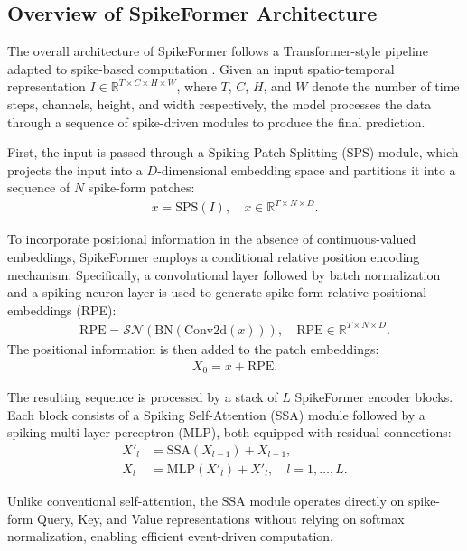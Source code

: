 \documentclass[../main.tex]{subfiles}
\begin{document}
\subsection{Overview of SpikeFormer Architecture}

The overall architecture of SpikeFormer follows a Transformer-style pipeline adapted to spike-based computation \cite{zhou2023spikeformer}. Given an input spatio-temporal representation $I \in \mathbb{R}^{T \times C \times H \times W}$, where $T$, $C$, $H$, and $W$ denote the number of time steps, channels, height, and width respectively, the model processes the data through a sequence of spike-driven modules to produce the final prediction.

First, the input is passed through a Spiking Patch Splitting (SPS) module, which projects the input into a $D$-dimensional embedding space and partitions it into a sequence of $N$ spike-form patches:
\begin{align}
x = \mathrm{SPS}(I), \quad x \in \mathbb{R}^{T \times N \times D}.
\end{align}

To incorporate positional information in the absence of continuous-valued embeddings, SpikeFormer employs a conditional relative position encoding mechanism. Specifically, a convolutional layer followed by batch normalization and a spiking neuron layer is used to generate spike-form relative positional embeddings (RPE):
\begin{align}
\mathrm{RPE} = \mathcal{SN}(\mathrm{BN}(\mathrm{Conv2d}(x))), \quad \mathrm{RPE} \in \mathbb{R}^{T \times N \times D}.
\end{align}
The positional information is then added to the patch embeddings:
\begin{align}
X_0 = x + \mathrm{RPE}.
\end{align}

The resulting sequence is processed by a stack of $L$ SpikeFormer encoder blocks. Each block consists of a Spiking Self-Attention (SSA) module followed by a spiking multi-layer perceptron (MLP), both equipped with residual connections:
\begin{align}
X'_l &= \mathrm{SSA}(X_{l-1}) + X_{l-1}, \\
X_l &= \mathrm{MLP}(X'_l) + X'_l, \quad l = 1, \dots, L.
\end{align}

Unlike conventional self-attention, the SSA module operates directly on spike-form Query, Key, and Value representations without relying on softmax normalization, enabling efficient event-driven computation.
\end{document}
